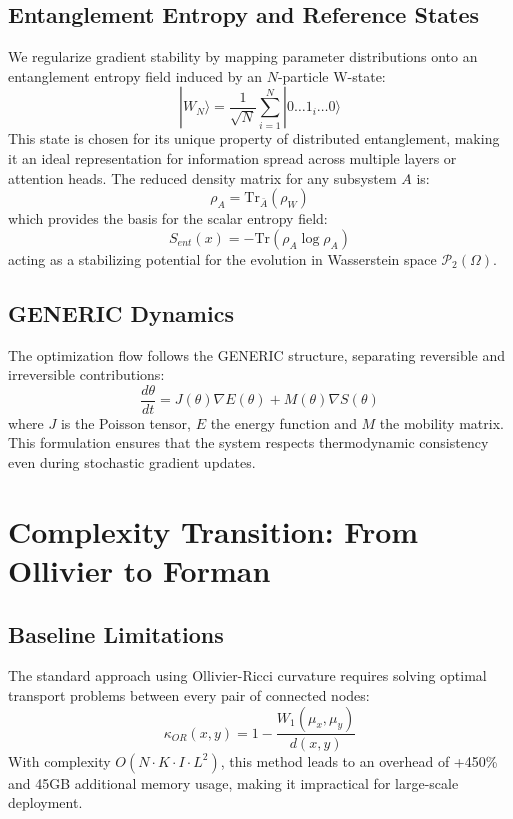 \documentclass[11pt,twocolumn]{article}
\begin{document}
\subsection{Entanglement Entropy and Reference States}
We regularize gradient stability by mapping parameter distributions onto an entanglement entropy field induced by an $N$-particle W-state:
\begin{equation}
|W_N\rangle = \frac{1}{\sqrt{N}} \sum_{i=1}^N |0 \dots 1_i \dots 0\rangle
\end{equation}
This state is chosen for its unique property of distributed entanglement, making it an ideal representation for information spread across multiple layers or attention heads. The reduced density matrix for any subsystem $A$ is:
\begin{equation}
\rho_A = \mathrm{Tr}_{\bar{A}}(\rho_W)
\end{equation}
which provides the basis for the scalar entropy field:
\begin{equation}
S_{ent}(x) = - \mathrm{Tr}(\rho_A \log \rho_A)
\end{equation}
acting as a stabilizing potential for the evolution in Wasserstein space $\mathcal{P}_2(\Omega)$.

\subsection{GENERIC Dynamics}
The optimization flow follows the GENERIC structure, separating reversible and irreversible contributions:
\begin{equation}
\frac{d\theta}{dt} = J(\theta)\nabla E(\theta) + M(\theta)\nabla S(\theta)
\end{equation}
where $J$ is the Poisson tensor, $E$ the energy function and $M$ the mobility matrix. This formulation ensures that the system respects thermodynamic consistency even during stochastic gradient updates.

\section{Complexity Transition: From Ollivier to Forman}

\subsection{Baseline Limitations}
The standard approach using Ollivier-Ricci curvature requires solving optimal transport problems between every pair of connected nodes:
\begin{equation}
\kappa_{OR}(x,y) = 1 - \frac{W_1(\mu_x, \mu_y)}{d(x,y)}
\end{equation}
With complexity $O(N \cdot K \cdot I \cdot L^2)$, this method leads to an overhead of +450\% and 45GB additional memory usage, making it impractical for large-scale deployment.
\end{document}
